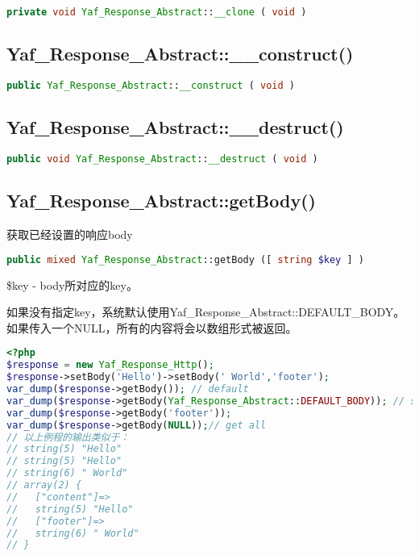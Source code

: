 \begin{lstlisting}[language=PHP]
private void Yaf_Response_Abstract::__clone ( void )
\end{lstlisting}


\subsection{Yaf\_Response\_Abstract::\_\_construct()}


\begin{lstlisting}[language=PHP]
public Yaf_Response_Abstract::__construct ( void )
\end{lstlisting}

\subsection{Yaf\_Response\_Abstract::\_\_destruct()}


\begin{lstlisting}[language=PHP]
public void Yaf_Response_Abstract::__destruct ( void )
\end{lstlisting}

\subsection{Yaf\_Response\_Abstract::getBody()}

获取已经设置的响应body


\begin{lstlisting}[language=PHP]
public mixed Yaf_Response_Abstract::getBody ([ string $key ] )
\end{lstlisting}

\begin{compactitem}
\item\$key - body所对应的key。

如果没有指定key，系统默认使用Yaf\_Response\_Abstract::DEFAULT\_BODY。如果传入一个NULL，所有的内容将会以数组形式被返回。
\end{compactitem}

\begin{lstlisting}[language=PHP]
<?php
$response = new Yaf_Response_Http();
$response->setBody('Hello')->setBody(' World','footer');
var_dump($response->getBody()); // default
var_dump($response->getBody(Yaf_Response_Abstract::DEFAULT_BODY)); // same as above
var_dump($response->getBody('footer'));
var_dump($response->getBody(NULL));// get all
// 以上例程的输出类似于：
// string(5) "Hello"
// string(5) "Hello"
// string(6) " World"
// array(2) {
//   ["content"]=>
//   string(5) "Hello"
//   ["footer"]=>
//   string(6) " World"
// }
\end{lstlisting}


